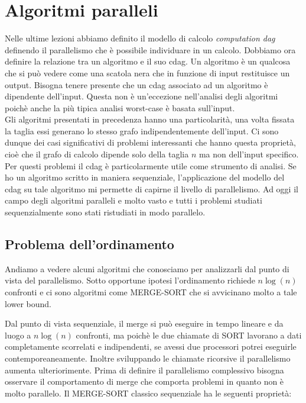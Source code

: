 \documentclass[a4paper,portrait,12pt]{article}
\theoremstyle{definition}
\begin{document}
\section{Algoritmi paralleli}

Nelle ultime lezioni abbiamo definito il modello di calcolo \textit{computation dag} definendo il parallelismo che è possibile individuare in un calcolo.
Dobbiamo ora definire la relazione tra un algoritmo e il suo cdag.
Un algoritmo è un qualcosa che si può vedere come una scatola nera che in funzione di input restituisce
un output.
Bisogna tenere presente che un cdag associato ad un algoritmo è dipendente dell’input.
Questa non è un’eccezione nell’analisi degli algoritmi poichè anche la più tipica analisi worst-case è basata sull’input.\\	

Gli algoritmi presentati in precedenza hanno una particolarità, una volta fissata la taglia essi generano lo stesso grafo indipendentemente dell’input.
Ci sono dunque dei casi significativi di problemi interessanti che hanno questa proprietà, cioè che il grafo di calcolo dipende solo della taglia $n$ ma non
dell’input specifico.
Per questi problemi il cdag è particolarmente utile come strumento di analisi.
Se ho un algoritmo scritto in maniera sequenziale, l’applicazione del modello del cdag su tale algoritmo mi permette di capirne il livello di parallelismo.
Ad oggi il campo degli algoritmi paralleli e molto vasto e tutti i problemi studiati sequenzialmente sono stati ristudiati in modo parallelo.


\subsection{Problema dell'ordinamento}

Andiamo a vedere alcuni algoritmi che conosciamo per analizzarli dal punto di vista del parallelismo.
Sotto opportune ipotesi l’ordinamento richiede $n\log(n)$ confronti e ci sono algoritmi come MERGE-SORT che si avvicinano molto a tale lower bound.

Dal punto di vista sequenziale, il merge si può eseguire in tempo lineare e da luogo a $n\log(n)$ confronti, ma poichè le due chiamate di SORT lavorano a dati completamente scorrelati e indipendenti, se avessi due processori potrei eseguirle contemporeaneamente.
Inoltre sviluppando le chiamate ricorsive il parallelismo aumenta ulteriorimente.
Prima di definire il parallelismo complessivo bisogna osservare il comportamento di merge che comporta problemi in quanto non è molto parallelo.
Il MERGE-SORT classico sequenziale ha le seguenti proprietà:
\end{document}
